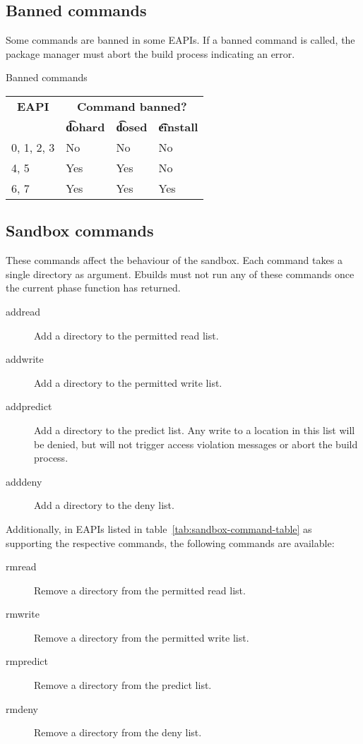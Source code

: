 \subsection{Banned commands}
\label{sec:banned-commands}

 Some commands are banned in some EAPIs. If a banned command is
called, the package manager must abort the build process indicating an error.

\begin{centertable}{Banned commands}
    \label{tab:banned-commands-table}
    \begin{tabular}{llll}
      \toprule
      \multicolumn{1}{c}{\textbf{EAPI}} &
      \multicolumn{3}{c}{\textbf{Command banned?}} \\
      \multicolumn{1}{c}{} &
      \multicolumn{1}{c}{\textbf{\t{dohard}}} &
      \multicolumn{1}{c}{\textbf{\t{dosed}}} &
      \multicolumn{1}{c}{\textbf{\t{einstall}}} \\
      \midrule
      0, 1, 2, 3        & No  & No  & No  \\
      4, 5              & Yes & Yes & No  \\
      6, 7              & Yes & Yes & Yes \\
      \bottomrule
    \end{tabular}
\end{centertable}

\subsection{Sandbox commands}
These commands affect the behaviour of the sandbox. Each command takes a single directory as
argument. Ebuilds must not run any of these commands once the current phase function has returned.
\begin{description}
\item[addread] Add a directory to the permitted read list.
\item[addwrite] Add a directory to the permitted write list.
\item[addpredict] Add a directory to the predict list. Any write to a location in this list will be
    denied, but will not trigger access violation messages or abort the build process.
\item[adddeny] Add a directory to the deny list.
\end{description}

 Additionally, in EAPIs listed in table~\ref{tab:sandbox-command-table}
as supporting the respective commands, the following commands are available:
\begin{description}
\item[rmread] Remove a directory from the permitted read list.
\item[rmwrite] Remove a directory from the permitted write list.
\item[rmpredict] Remove a directory from the predict list.
\item[rmdeny] Remove a directory from the deny list.
\end{description}

